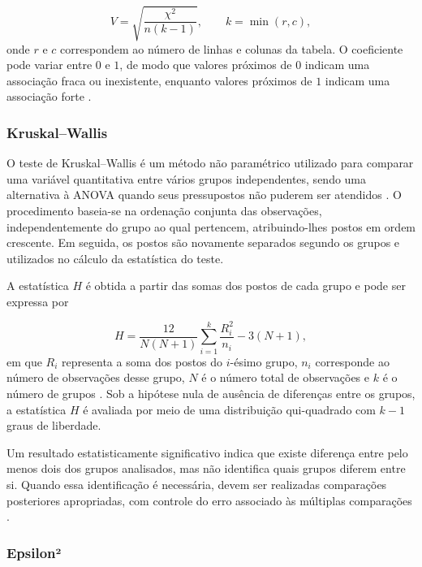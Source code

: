 \documentclass[12pt]{article}
\begin{document}
\begin{equation}
    V = \sqrt{\frac{\chi^2}{n(k-1)}},
    \qquad
    k = \min(r,c),
\end{equation}
onde $r$ e $c$ correspondem ao número de linhas e colunas da tabela. O coeficiente pode variar entre $0$ e $1$, de modo que valores próximos de $0$ indicam uma associação fraca ou inexistente, enquanto valores próximos de $1$ indicam uma associação forte \cite{navarro2015learning}.

\subsubsection{Kruskal--Wallis}

O teste de Kruskal--Wallis é um método não paramétrico utilizado para comparar uma variável quantitativa entre vários grupos independentes, sendo uma alternativa à ANOVA  quando seus pressupostos não puderem ser atendidos \cite{field2009discovering}. O procedimento baseia-se na ordenação conjunta das observações, independentemente do grupo ao qual pertencem, atribuindo-lhes postos em ordem crescente. Em seguida, os postos são novamente separados segundo os grupos e utilizados no cálculo da estatística do teste.

A estatística $H$ é obtida a partir das somas dos postos de cada grupo e pode ser expressa por

\begin{equation}
H =
\frac{12}{N(N+1)}
\sum_{i=1}^{k}
\frac{R_i^2}{n_i}
- 3(N+1),
\end{equation}
em que $R_i$ representa a soma dos postos do $i$-ésimo grupo, $n_i$ corresponde ao número de observações desse grupo, $N$ é o número total de observações e $k$ é o número de grupos \cite{field2009discovering}. Sob a hipótese nula de ausência de diferenças entre os grupos, a estatística $H$ é avaliada por meio de uma distribuição qui-quadrado com $k-1$ graus de liberdade.

Um resultado estatisticamente significativo indica que existe diferença entre pelo menos dois dos grupos analisados, mas não identifica quais grupos diferem entre si. Quando essa identificação é necessária, devem ser realizadas comparações posteriores apropriadas, com controle do erro associado às múltiplas comparações \cite{field2009discovering}.

\subsubsection{Epsilon²}
\end{document}

